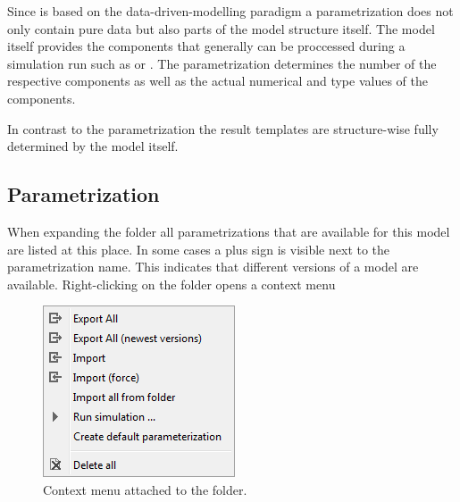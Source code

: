 Since \RA{} is based on the data-driven-modelling paradigm a parametrization does not only contain pure data but also parts of the model structure itself. The model itself provides the components that generally can be proccessed during a simulation run such as  or . The parametrization determines the number of the respective components as well as the actual numerical and type values of the components.

In contrast to the parametrization the result templates are structure-wise fully determined by the model itself. 

\subsection{Parametrization}
\label{subsec:parametrization}
When expanding the  folder all parametrizations that are available for this model are listed at this place. In some cases a plus sign is visible next to the parametrization name. This indicates that different versions of a model are available. Right-clicking on the folder  opens a context menu

\begin{figure}[htb]
	\centering
		\includegraphics[scale=0.6]{images/menuParametrizationFolder.png}
	\caption{Context menu attached to the  folder.}
	\label{fig:menuParametrizationFolder}
\end{figure}

